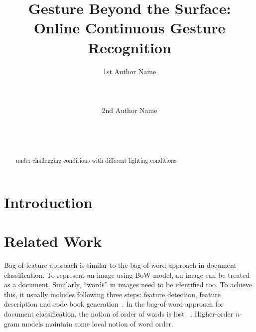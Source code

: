 \documentclass{sigchi}
\begin{document}
\title{Gesture Beyond the Surface: Online Continuous Gesture Recognition}

\author{
  \alignauthor 1st Author Name\\
    \\
    \\
    \\
  \alignauthor 2nd Author Name\\
    \\
    \\
    \\
}

\maketitle

\begin{abstract}
under challenging conditions with different lighting conditions
\end{abstract}



\section{Introduction}


\section{Related Work}
Bag-of-feature approach is similar to the bag-of-word approach in document classification.
To represent an image using BoW model, an image can be treated as a document. Similarly,
``words'' in images need to be identified too. To achieve this, it usually includes
following three steps: feature detection, feature description and code book generation~\cite{fei2005}.
In the bag-of-word approach for document classification, the notion of order of words is lost
~\cite{Russell2003}. Higher-order $n$-gram models maintain some local notion of word order.
\end{document}
